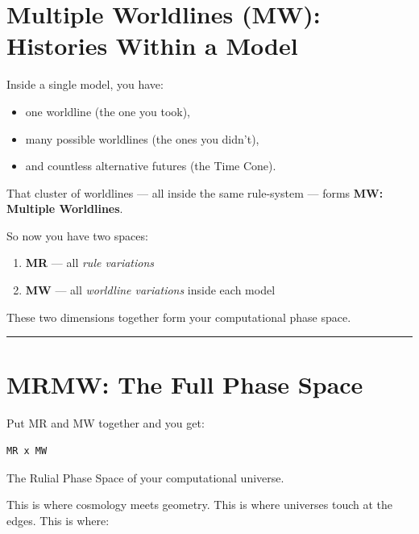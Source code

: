 \section{\texorpdfstring{\textbf{Multiple Worldlines (MW):
Histories Within a
Model}}{8.2 --- Multiple Worldlines (MW): Histories Within a Model}}\label{multiple-worldlines-mw-histories-within-a-model}

Inside a single model, you have:

\begin{itemize}
\tightlist
\item
  one worldline (the one you took),\\
\item
  many possible worldlines (the ones you didn't),
\item
  and countless alternative futures (the Time Cone).
\end{itemize}

That cluster of worldlines --- all inside the same rule-system --- forms
\textbf{MW: Multiple Worldlines}.

So now you have two spaces:

\begin{enumerate}
\def\labelenumi{\arabic{enumi}.}
\tightlist
\item
  \textbf{MR} --- all \emph{rule variations}\\
\item
  \textbf{MW} --- all \emph{worldline variations} inside each model
\end{enumerate}

These two dimensions together form your computational phase space.

\begin{center}\rule{0.5\linewidth}{0.5pt}\end{center}

\section{\texorpdfstring{\textbf{MRMW: The Full Phase
Space}}{8.3 --- MRMW: The Full Phase Space}}\label{mrmw-the-full-phase-space}

Put MR and MW together and you get:

\begin{lstlisting}
MR x MW
\end{lstlisting}

The Rulial Phase Space of your computational universe.

This is where cosmology meets geometry. This is where universes touch at
the edges. This is where:

